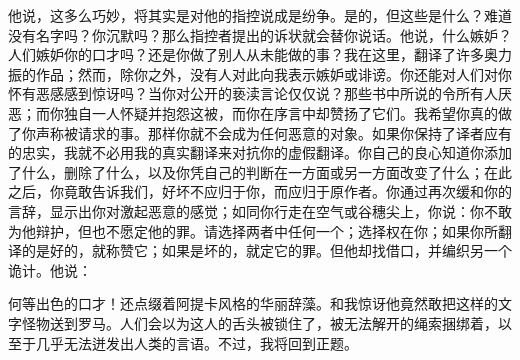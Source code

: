 他说，这多么巧妙，将其实是对他的指控说成是纷争。是的，但这些是什么？难道没有名字吗？你沉默吗？那么指控者提出的诉状就会替你说话。他说，什么嫉妒？人们嫉妒你的口才吗？还是你做了别人从未能做的事？我在这里，翻译了许多奥力振的作品；然而，除你之外，没有人对此向我表示嫉妒或诽谤。你还能对人们对你怀有恶感感到惊讶吗？当你对公开的亵渎言论仅仅说？那些书中所说的令所有人厌恶；而你独自一人怀疑并抱怨这被，而你在序言中却赞扬了它们。我希望你真的做了你声称被请求的事。那样你就不会成为任何恶意的对象。如果你保持了译者应有的忠实，我就不必用我的真实翻译来对抗你的虚假翻译。你自己的良心知道你添加了什么，删除了什么，以及你凭自己的判断在一方面或另一方面改变了什么；在此之后，你竟敢告诉我们，好坏不应归于你，而应归于原作者。你通过再次缓和你的言辞，显示出你对激起恶意的感觉；如同你行走在空气或谷穗尖上，你说：你不敢为他辩护，但也不愿定他的罪。请选择两者中任何一个；选择权在你；如果你所翻译的是好的，就称赞它；如果是坏的，就定它的罪。但他却找借口，并编织另一个诡计。他说：\par

\par

何等出色的口才！还点缀着阿提卡风格的华丽辞藻。和我惊讶他竟然敢把这样的文字怪物送到罗马。人们会以为这人的舌头被锁住了，被无法解开的绳索捆绑着，以至于几乎无法迸发出人类的言语。不过，我将回到正题。\par

